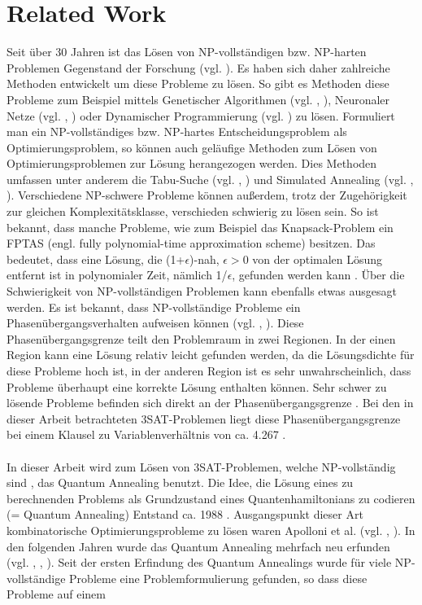 \documentclass[runningheads]{llncs}
\begin{document}
\section{Related Work}
Seit über 30 Jahren ist das Lösen von NP-vollständigen bzw. NP-harten Problemen Gegenstand der Forschung (vgl. \cite{murty1987some}). Es haben sich daher zahlreiche Methoden entwickelt um diese Probleme zu lösen. So gibt es Methoden diese Probleme zum Beispiel mittels Genetischer Algorithmen (vgl. \cite{de1989using}, \cite{khuri1994zero}), Neuronaler Netze (vgl. \cite{anderson1988neural}, \cite{bruck1988power}) oder Dynamischer Programmierung (vgl. \cite{woeginger2003exact}) zu lösen. Formuliert man ein NP-vollständiges bzw. NP-hartes Entscheidungsproblem als Optimierungsproblem, so können auch geläufige Methoden zum Lösen von Optimierungsproblemen zur Lösung herangezogen werden. Dies Methoden umfassen unter anderem die Tabu-Suche (vgl. \cite{glover2013tabu}, \cite{gendreau1994tabu}) und Simulated Annealing (vgl. \cite{kirkpatrick1983optimization}, \cite{chen1995chaotic}). Verschiedene NP-schwere Probleme können außerdem, trotz der Zugehörigkeit zur gleichen Komplexitätsklasse, verschieden schwierig zu lösen sein. So ist bekannt, dass  manche Probleme, wie zum Beispiel das Knapsack-Problem ein FPTAS (engl. fully polynomial-time approximation scheme) besitzen. Das bedeutet, dass eine Lösung, die (1+$\epsilon$)-nah, $\epsilon > 0$ von der optimalen Lösung entfernt ist in polynomialer Zeit, nämlich 1/$\epsilon$, gefunden werden kann \cite{chen1995chaotic}. Über die Schwierigkeit von NP-vollständigen Problemen kann ebenfalls etwas ausgesagt werden. Es ist bekannt, dass NP-vollständige Probleme ein Phasenübergangsverhalten aufweisen können (vgl. \cite{monasson1999determining}, \cite{kirkpatrick1994critical}). Diese Phasenübergangsgrenze teilt den Problemraum in zwei Regionen. In der einen Region kann eine Lösung relativ leicht gefunden werden, da die Lösungsdichte für diese Probleme hoch ist, in der anderen Region ist es sehr unwahrscheinlich, dass Probleme überhaupt eine korrekte Lösung enthalten können. Sehr schwer zu lösende Probleme befinden sich direkt an der Phasenübergangsgrenze \cite{cheeseman1991really}. Bei den in dieser Arbeit betrachteten 3SAT-Problemen liegt diese Phasenübergangsgrenze bei einem Klausel zu Variablenverhältnis von ca. 4.267 \cite{mezard2002random}.\\\\In dieser Arbeit wird zum Lösen von 3SAT-Problemen, welche NP-vollständig sind \cite{cook1971complexity}, das Quantum Annealing benutzt. Die Idee, die Lösung eines zu berechnenden Problems als Grundzustand eines Quantenhamiltonians zu codieren (= Quantum Annealing) Entstand ca. 1988 \cite{albash2016adiabatic}. Ausgangspunkt dieser Art kombinatorische Optimierungsprobleme zu lösen waren Apolloni et al. (vgl. \cite{apolloni1989quantum}, \cite{apolloni1988numerical}). In den folgenden Jahren wurde das Quantum Annealing mehrfach neu erfunden  \cite{albash2016adiabatic} (vgl. \cite{finnila1994quantum}, \cite{amara1993global}, \cite{kadowaki1998quantum}). Seit der ersten Erfindung des Quantum Annealings wurde für viele NP-vollständige Probleme eine Problemformulierung gefunden, so dass diese Probleme auf einem 
\end{document}
